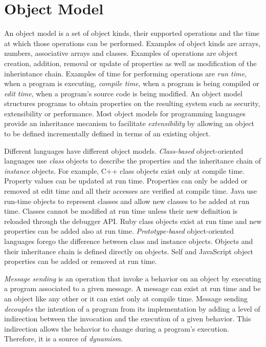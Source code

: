 \section{Object Model}

An object model is a set of object kinds, their supported operations and the
time at which those operations can be performed.  Examples of object kinds are
arrays, numbers, associative arrays and classes.  Examples of operations are
object creation, addition, removal or update of properties as well as
modification of the inherintance chain. Examples of time for performing
operations are \textit{run time}, when a program is executing, \textit{compile
time}, when a program is being compiled or \textit{edit time}, when a program's
source code is being modified. An object model structures programs to obtain
properties on the resulting system such as security, extensibility or
performance. Most object models for programming languages provide an
inheritance mecanism to facilitate \textit{extensibility} by allowing an object
to be defined incrementally defined in terms of an existing object.

Different languages have different object models. \textit{Class-based}
object-oriented languages use \textit{class} objects to describe the properties
and the inheritance chain of \textit{instance} objects. For example, C++ class
objects exist only at compile time. Property values can be updated at run time.
Properties can only be added or removed at edit time and all their accesses are
verified at compile time. Java use run-time objects to represent classes and
allow new classes to be added at run time.  Classes cannot be modified at run
time unless their new definition is reloaded through the debugger API. Ruby
class objects exist at run time and new properties can be added also at run
time. \textit{Prototype-based} object-oriented languages forego the difference
between class and instance objects. Objects and their inheritance chain is
defined directly on objects. Self and JavaScript object properties can be
added or removed at run time. 

\textit{Message sending} is an operation that invoke a behavior on an object by
executing a program associated to a given message.  A message can exist at run
time and be an object like any other or it can exist only at compile time.
Message sending \textit{decouples} the intention of a program from its
implementation by adding a level of indirection between the invocation and the
execution of a given behavior. This indirection allows the behavior to change
during a program's execution. Therefore, it is a source of \textit{dynamism}.

